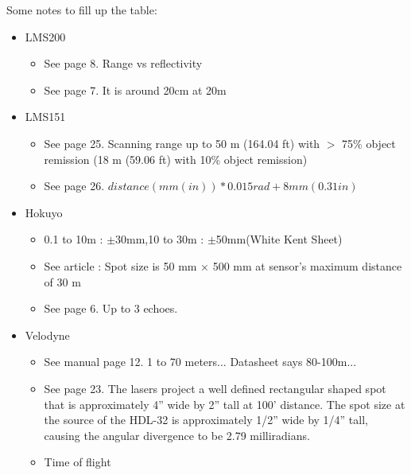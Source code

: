 Some notes to fill up the table:
\begin{itemize}
    \item LMS200
        \begin{itemize}
            \item See page 8. Range vs reflectivity
            \item See page 7. It is around 20cm at 20m
        \end{itemize}
    \item LMS151
        \begin{itemize}
            \item See page 25. Scanning range up to 50 m (164.04 ft) with $>$ 75\% object remission (18 m (59.06 ft) with 10\% object remission)
            \item See page 26. $distance(mm (in)) * 0.015 rad + 8 mm (0.31 in)$
        \end{itemize}
    \item Hokuyo
        \begin{itemize}
            \item 0.1 to 10m : $\pm$30mm,10 to 30m : $\pm$50mm(White Kent Sheet)
            \item See article : Spot size is 50 mm × 500 mm at sensor’s maximum distance of 30 m
            \item See page 6. Up to 3 echoes.
        \end{itemize}
    \item Velodyne
        \begin{itemize}
            \item See manual page 12. 1 to 70 meters... Datasheet says 80-100m...
            \item See page 23. The lasers project a well defined rectangular shaped spot that is approximately 4” wide by 2” tall at 100’ distance. The spot size at the source of the HDL-32 is approximately 1/2” wide by 1/4” tall, causing the angular divergence to be 2.79 milliradians.
            \item Time of flight
        \end{itemize}
\end{itemize}


